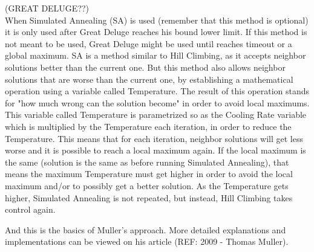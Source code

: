 (GREAT DELUGE??)
\\
When Simulated Annealing (SA) is used (remember that this method is optional) it is only used after Great Deluge reaches his bound lower limit. If this method is not meant to be used, Great Deluge might be used until reaches timeout or a global maximum. SA is a method similar to Hill Climbing, as it accepts neighbor solutions better than the current one. But this method also allows neighbor solutions that are worse than the current one, by establishing a mathematical operation using a variable called Temperature. The result of this operation stands for "how much wrong can the solution become" in order to avoid local maximums. This variable called Temperature is parametrized so as the Cooling Rate variable which is multiplied by the Temperature each iteration, in order to reduce the Temperature. This means that for each iteration, neighbor solutions will get less worse and it is possible to reach a local maximum again. If the local maximum is the same (solution is the same as before running Simulated Annealing), that means the maximum Temperature must get higher in order to avoid the local maximum and/or to possibly get a better solution. As the Temperature gets higher, Simulated Annealing is not repeated, but instead, Hill Climbing takes control again.

And this is the basics of Muller's approach. More detailed explanations and implementations can be viewed on his article (REF: 2009 - Thomas Muller).



